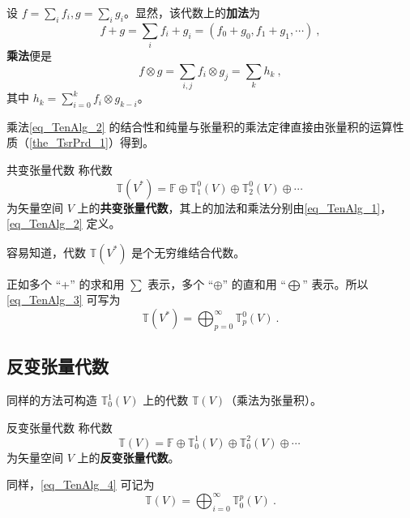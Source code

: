 设 $f=\sum\limits_ i f_i,g=\sum\limits_ i g_i$。显然，该代数上的\textbf{加法}为
\begin{equation}\label{eq_TenAlg_1}
f+g=\sum_{i}f_i+g_i=(f_0+g_0,f_1+g_1,\cdots)~,
\end{equation}
\textbf{乘法}便是
\begin{equation}\label{eq_TenAlg_2}
f\otimes g=\sum_{i,j}f_i\otimes g_j=\sum_k h_k~,
\end{equation}
其中 $h_k=\sum\limits_{i=0}^k f_i\otimes g_{k-i}$。

乘法\autoref{eq_TenAlg_2} 的结合性和纯量与张量积的乘法定律直接由张量积的运算性质（\autoref{the_TsrPrd_1}）得到。

\begin{definition}{共变张量代数}
称代数
\begin{equation}\label{eq_TenAlg_3}
\mathbb T(V^*)=\mathbb F\oplus\mathbb T_1^0(V)\oplus\mathbb T_2^0(V)\oplus\cdots~
\end{equation}
为矢量空间 $V$ 上的\textbf{共变张量代数}，其上的加法和乘法分别由\autoref{eq_TenAlg_1}，\autoref{eq_TenAlg_2} 定义。
\end{definition}

容易知道，代数 $\mathbb T(V^*)$ 是个无穷维结合代数。

正如多个 “+” 的求和用 $\sum$ 表示，多个 “$\oplus$” 的直和用 “$\bigoplus$” 表示。所以\autoref{eq_TenAlg_3} 可写为
\begin{equation}
\mathbb T(V^*)=\bigoplus_{p=0}^\infty\mathbb T_p^0(V)~.
\end{equation}
 
\subsection{反变张量代数}
同样的方法可构造 $\mathbb T^1_0(V)$ 上的代数 $\mathbb T(V)$（乘法为张量积）。
\begin{definition}{反变张量代数}
称代数
\begin{equation}\label{eq_TenAlg_4}
\mathbb T(V)=\mathbb F\oplus\mathbb T_0^1(V)\oplus\mathbb T_0^2(V)\oplus\cdots~
\end{equation}
为矢量空间 $V$ 上的\textbf{反变张量代数}。
\end{definition}

同样，\autoref{eq_TenAlg_4} 可记为
\begin{equation}
\mathbb T(V)=\bigoplus_{i=0}^\infty \mathbb T_0^p(V)~.
\end{equation}

